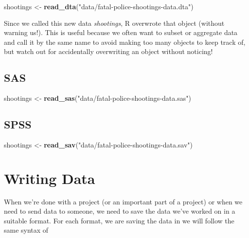 \documentclass[
  12pt,
]{book}
\newenvironment{Shaded}{\begin{snugshade}}{\end{snugshade}}
\newcommand{\KeywordTok}[1]{\textcolor[rgb]{0.13,0.29,0.53}{\textbf{#1}}}
\newcommand{\NormalTok}[1]{#1}
\newcommand{\StringTok}[1]{\textcolor[rgb]{0.31,0.60,0.02}{#1}}
\begin{document}
\begin{Shaded}
\begin{Highlighting}[]
\NormalTok{shootings <{-}}\StringTok{ }\KeywordTok{read\_dta}\NormalTok{(}\StringTok{"data/fatal{-}police{-}shootings{-}data.dta"}\NormalTok{)}
\end{Highlighting}
\end{Shaded}

Since we called this new data \emph{shootings}, R overwrote that object (without warning us!). This is useful because we often want to subset or aggregate data and call it by the same name to avoid making too many objects to keep track of, but watch out for accidentally overwriting an object without noticing!

\hypertarget{sas}{%
\subsection{SAS}\label{sas}}

\begin{Shaded}
\begin{Highlighting}[]
\NormalTok{shootings <{-}}\StringTok{ }\KeywordTok{read\_sas}\NormalTok{(}\StringTok{"data/fatal{-}police{-}shootings{-}data.sas"}\NormalTok{)}
\end{Highlighting}
\end{Shaded}

\hypertarget{spss}{%
\subsection{SPSS}\label{spss}}

\begin{Shaded}
\begin{Highlighting}[]
\NormalTok{shootings <{-}}\StringTok{ }\KeywordTok{read\_sav}\NormalTok{(}\StringTok{"data/fatal{-}police{-}shootings{-}data.sav"}\NormalTok{)}
\end{Highlighting}
\end{Shaded}

\hypertarget{writing-data}{%
\section{Writing Data}\label{writing-data}}

When we're done with a project (or an important part of a project) or when we need to send data to someone, we need to save the data we've worked on in a suitable format. For each format, we are saving the data in we will follow the same syntax of
\end{document}
